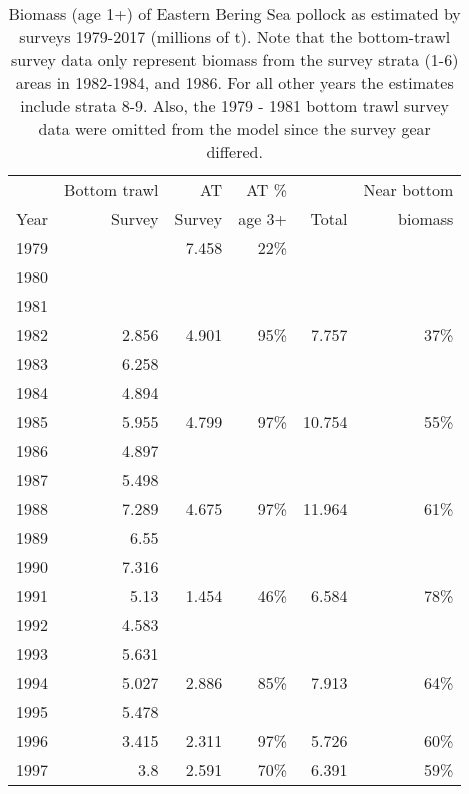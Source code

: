 \documentclass[]{article}
\begin{document}
\begin{table}[ht]  
\centering  
\label{tab:survbiom}
\caption{Biomass (age 1+) of Eastern Bering Sea pollock as estimated by surveys 1979-2017 (millions of t).  Note that the bottom-trawl survey data only represent biomass from the survey strata (1-6) areas in 1982-1984, and 1986. For all other years the estimates include strata 8-9.  Also, the 1979 - 1981 bottom trawl survey data were omitted from the model since the survey gear differed.}
\begin{tabular}{crrrrr}
\hline
        &   Bottom trawl &   AT     &   AT \%     &       &   Near bottom \\
Year    &   Survey       &   Survey &   age 3+    & Total &   biomass      \\
\hline
1979    &       &   7.458   &   22\% &       &       \\
1980    &       &       &       &       &       \\
1981    &       &       &       &       &       \\
1982    &   2.856   &   4.901   &   95\% &   7.757   &   37\% \\
1983    &   6.258   &       &       &       &       \\
1984    &   4.894   &       &       &       &       \\
1985    &   5.955   &   4.799   &   97\% &   10.754  &   55\% \\
1986    &   4.897   &       &       &       &       \\
1987    &   5.498   &       &       &       &       \\
1988    &   7.289   &   4.675   &   97\% &   11.964  &   61\% \\
1989    &   6.55    &       &       &       &       \\
1990    &   7.316   &       &       &       &       \\
1991    &   5.13    &   1.454   &   46\% &   6.584   &   78\% \\
1992    &   4.583   &       &       &       &       \\
1993    &   5.631   &       &       &       &       \\
1994    &   5.027   &   2.886   &   85\% &   7.913   &   64\% \\
1995    &   5.478   &       &       &       &       \\
1996    &   3.415   &   2.311   &   97\% &   5.726   &   60\% \\
1997    &   3.8 &   2.591   &   70\% &   6.391   &   59\% \\

\end{tabular}
\end{table}
\end{document}
